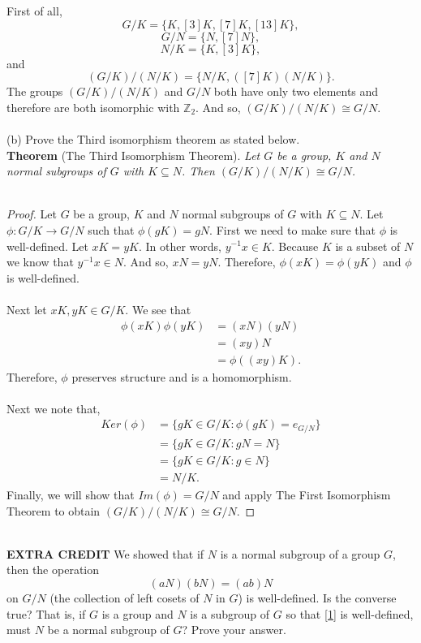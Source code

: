 \documentclass[11pt]{article}
\begin{document}
First of all,
\[ G/K = \{K, [3]K, [7]K, [13]K\},\]
\[ G/N = \{N, [7]N\}, \]
\[ N/K = \{K, [3]K\},\]
and
\[(G/K)/(N/K) = \{ N/K, ([7]K)(N/K) \}.\]
The groups $(G/K)/(N/K)$ and $G/N$ both have only two elements and therefore are both isomorphic with $\mathbb{Z}_2$. And so, $(G/K)/(N/K) \cong G/N$.\\
~\\
(b) Prove the Third isomorphism theorem as stated below.\\
{\bf Theorem} (The Third Isomorphism Theorem). {\it Let $G$ be a group, $K$ and $N$ normal subgroups of $G$ with $K \subseteq N$. Then $(G/K)/(N/K) \cong G/N$.}\\
~\\
\begin{proof}
Let $G$ be a group, $K$ and $N$ normal subgroups of $G$ with $K \subseteq N$. Let $\phi : G/K \rightarrow G/N$ such that $\phi(gK) = gN $. First we need to make sure that $\phi$ is well-defined. Let $xK = yK$. In other words, $y^{-1}x \in K$. Because $K$ is a subset of $N$ we know that $y^{-1}x \in N$. And so, $xN = yN$. Therefore, $\phi(xK) = \phi(yK)$ and $\phi$ is well-defined.\\
~\\
Next let $xK,yK \in G/K $. We see that
\begin{align*}
\phi(xK)\phi(yK) &= (xN)(yN)\\
&= (xy)N\\
&= \phi((xy)K).
\end{align*}
Therefore, $\phi$ preserves structure and is a homomorphism. \\
~\\
Next we note that,
\begin{align*}
Ker(\phi) &= \{gK \in G/K: \phi(gK) = e_{G/N} \}\\
&= \{ gK \in G/K: gN = N \}\\
&= \{ gK \in G/K: g \in N \}\\
&= N/K.
\end{align*}
Finally, we will show that $Im(\phi) = G/N$ and apply The First Isomorphism Theorem to obtain $(G/K)/(N/K) \cong G/N$. 

\end{proof}
~\\
{\bf EXTRA CREDIT} We showed that if $N$ is a normal subgroup of a group $G$, then the operation
\begin{equation}\label{1}
(aN)(bN) = (ab)N
\end{equation}
on $G/N$ (the collection of left cosets of $N$ in $G$) is well-defined. Is the converse true? That is, if $G$ is a group and $N$ is a subgroup of $G$ so that \eqref{1} is well-defined, must $N$ be a normal subgroup of $G$? Prove your answer.\\
\end{document}
